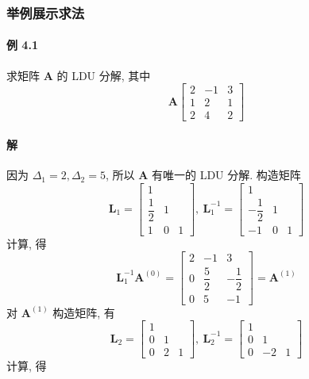 \subsubsection{举例展示求法}

\paragraph*{例 4.1} 求矩阵 $\bm{A}$ 的 LDU 分解, 其中
$$
    \bm{A}  \begin{bmatrix}
        2 & -1 & 3 \\
        1 & 2  & 1 \\
        2 & 4  & 2
    \end{bmatrix}
$$

\paragraph*{解} 因为 $\Delta_1 = 2, \Delta_2 = 5$, 所以 $\bm{A}$ 有唯一的 LDU 分解. 构造矩阵
$$
    \bm{L}_1 = \begin{bmatrix}
        1            &   &   \\
        \dfrac{1}{2} & 1 &   \\
        1            & 0 & 1
    \end{bmatrix}, \ \bm{L}_1^{-1} = \begin{bmatrix}
        1             &   &   \\
        -\dfrac{1}{2} & 1 &   \\
        -1            & 0 & 1
    \end{bmatrix}
$$
计算, 得
$$
    \bm{L}_1^{-1}\bm{A}^{(0)} = \begin{bmatrix}
        2 & -1           & 3             \\
        0 & \dfrac{5}{2} & -\dfrac{1}{2} \\
        0 & 5            & -1
    \end{bmatrix} = \bm{A}^{(1)}
$$
对 $\bm{A}^{(1)}$ 构造矩阵, 有
$$
    \bm{L}_2 = \begin{bmatrix}
        1 &   &   \\
        0 & 1 &   \\
        0 & 2 & 1
    \end{bmatrix},\ \bm{L}_2^{-1} = \begin{bmatrix}
        1 &    &   \\
        0 & 1  &   \\
        0 & -2 & 1
    \end{bmatrix}
$$
计算, 得
